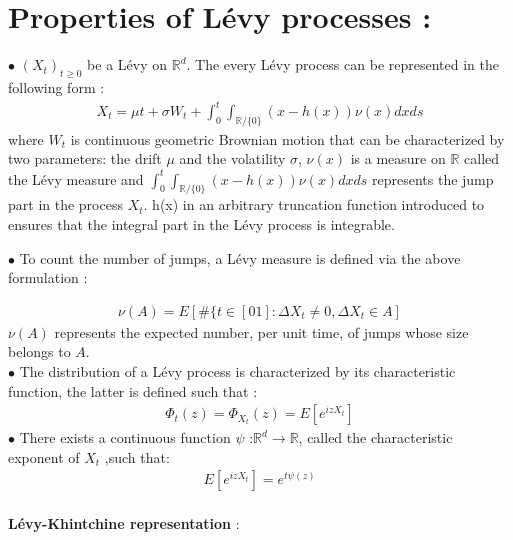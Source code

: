 \documentclass[12pt]{report}
\begin{document}
\section{Properties of  Lévy processes :}
$\bullet$  $(X_t)_{t \geqslant 0}$ be a Lévy  on $\mathbb{R}^d$. The every Lévy process can be represented in the following form :
\begin{gather}
X_t= \mu t+ \sigma W_t + \int_0^t \int_{\mathbb{R}/\{0\}} (x-h(x))\nu(x) dx ds 
\end{gather}
where $ W_t $ is continuous geometric  Brownian motion that can be characterized by two parameters: the drift $\mu$ and the volatility $\sigma$, $\nu(x)$ is a measure on $\mathbb{R}$ called the Lévy measure and  $\int_0^t\int_{\mathbb{R}/\{0\}}(x-h(x))\nu(x) dx ds$ represents the jump part in the process $X_t$. h(x) in an arbitrary truncation function introduced to ensures that the integral part in the Lévy process is integrable.\\


$\bullet$ To count the number of jumps, a Lévy measure is defined via the above formulation :

\begin{gather}
\nu(A)=E[\#\{t \in [0 1]: \Delta X_t \neq 0 , \Delta X_t \in A]
\end{gather}
$\nu(A)$ represents the expected number, per unit time, of jumps whose size belongs to $A$.\\
$\bullet$ The distribution of a Lévy process is characterized by its characteristic function, the latter is defined such that :\\
\begin{gather}
\Phi_t(z)=\Phi_{X_t}(z)=E[ e^{izX_t}]
\end{gather}
$\bullet$ There exists a continuous function $\psi $  :$\mathbb{R}^d  \rightarrow \mathbb{R} $, called the characteristic exponent of $X_t$ ,such that:\\
\begin{gather}
E[ e^{izX_t}]= e^ {t \psi (z)}
\end{gather}
\\
\textbf{ Lévy-Khintchine representation} :\\
\end{document}
